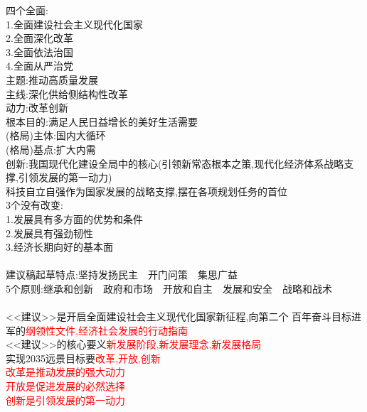 \documentclass[UTF8]{article}
\begin{document}
    四个全面:\\
    1.全面建设社会主义现代化国家\\
    2.全面深化改革\\
    3.全面依法治国\\
    4.全面从严治党\\
    主题:推动高质量发展\\
    主线:深化供给侧结构性改革\\
    动力:改革创新\\
    根本目的:满足人民日益增长的美好生活需要\\
    (格局)主体:国内大循环\\
    (格局)基点:扩大内需\\
    创新:我国现代化建设全局中的核心(引领新常态根本之策,现代化经济体系战略支撑,引领发展的第一动力)\\
    科技自立自强作为国家发展的战略支撑,摆在各项规划任务的首位\\
    3个没有改变:\\
    1.发展具有多方面的优势和条件\\
    2.发展具有强劲韧性\\
    3.经济长期向好的基本面\\
    \\
    建议稿起草特点:坚持发扬民主\(\quad\)开门问策\(\quad\)集思广益\\
    5个原则:继承和创新\(\quad\)政府和市场\(\quad\)开放和自主\(\quad\)发展和安全\(\quad\)战略和战术\\
    \\
    <<建议>>是开启全面建设社会主义现代化国家新征程,向第二个
    百年奋斗目标进军的\textcolor{red}{纲领性文件,经济社会发展的行动指南}\\
    <<建议>>的核心要义\textcolor{red}{新发展阶段,新发展理念,新发展格局}\\
    实现2035远景目标要\textcolor{red}{改革,开放,创新}\\
    \textcolor{red}{改革是推动发展的强大动力}\\
    \textcolor{red}{开放是促进发展的必然选择}\\
    \textcolor{red}{创新是引领发展的第一动力}\\
\end{document}
